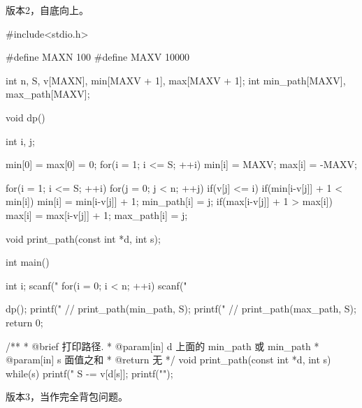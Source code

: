 版本2，自底向上。

\begin{Codex}[label=coin_change2.c]
#include<stdio.h>

#define MAXN 100
#define MAXV 10000

int n, S, v[MAXN], min[MAXV + 1], max[MAXV + 1];
int min_path[MAXV], max_path[MAXV];

void dp() {
    int i, j;

    min[0] = max[0] = 0;
    for(i = 1; i <= S; ++i) {
        min[i] = MAXV; 
        max[i] = -MAXV;
    }

    for(i = 1; i <= S; ++i) {
        for(j = 0; j < n; ++j) if(v[j] <= i) {
            if(min[i-v[j]] + 1 < min[i]) {
                min[i] = min[i-v[j]] + 1;
                min_path[i] = j;
            }
            if(max[i-v[j]] + 1 > max[i]) {
                max[i] = max[i-v[j]] + 1;
                max_path[i] = j;
            }
        }
    }
}

void print_path(const int *d, int s);

int main() {
    int i;
    scanf("%
    for(i = 0; i < n; ++i) scanf("%

    dp();
    printf("%
    // print_path(min_path, S);
    printf("%
    // print_path(max_path, S);
    return 0;
}

/**
 * @brief 打印路径.
 * @param[in] d 上面的 min_path 或 min_path
 * @param[in] s 面值之和
 * @return 无
 */
void print_path(const int *d, int s) {
    while(s) {
        printf("%
        S -= v[d[s]];
    }
    printf("\n");
}
\end{Codex}

版本3，当作完全背包问题。

